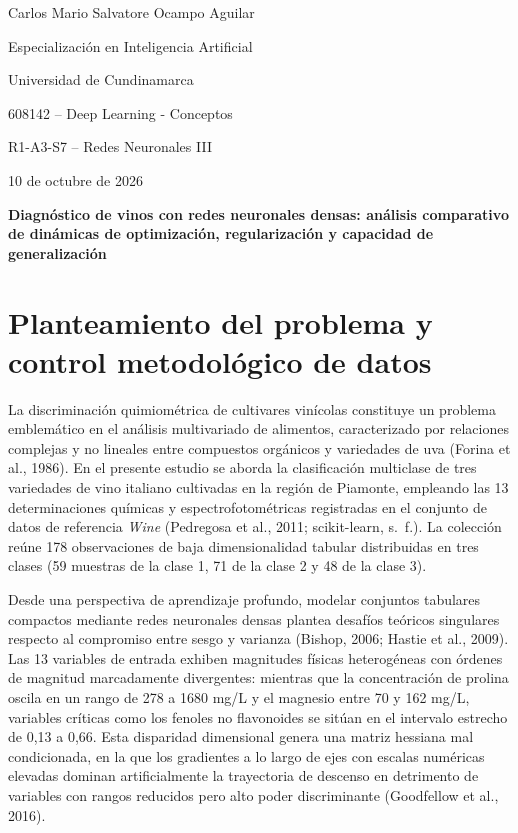 \documentclass[12pt,letterpaper]{article}
\begin{document}
\raggedright
\begin{titlepage}\thispagestyle{fancy}\begin{center}
\vspace*{1in}{\bfseries Diagnóstico de vinos con redes neuronales densas: análisis comparativo de dinámicas de optimización, regularización y capacidad de generalización\par}\vspace{1\baselineskip}
Carlos Mario Salvatore Ocampo Aguilar\par
Especialización en Inteligencia Artificial\par Universidad de Cundinamarca\par
608142 -- Deep Learning - Conceptos\par R1-A3-S7 -- Redes Neuronales III\par 10 de octubre de 2026\par
\end{center}\vfill\end{titlepage}\setcounter{page}{2}
\begin{center}\textbf{Diagnóstico de vinos con redes neuronales densas: análisis comparativo de dinámicas de optimización, regularización y capacidad de generalización}\end{center}

\section{Planteamiento del problema y control metodológico de datos}
La discriminación quimiométrica de cultivares vinícolas constituye un problema emblemático en el análisis multivariado de alimentos, caracterizado por relaciones complejas y no lineales entre compuestos orgánicos y variedades de uva (Forina et al., 1986). En el presente estudio se aborda la clasificación multiclase de tres variedades de vino italiano cultivadas en la región de Piamonte, empleando las 13 determinaciones químicas y espectrofotométricas registradas en el conjunto de datos de referencia \textit{Wine} (Pedregosa et al., 2011; scikit-learn, s.~f.). La colección reúne 178 observaciones de baja dimensionalidad tabular distribuidas en tres clases (59 muestras de la clase 1, 71 de la clase 2 y 48 de la clase 3).

Desde una perspectiva de aprendizaje profundo, modelar conjuntos tabulares compactos mediante redes neuronales densas plantea desafíos teóricos singulares respecto al compromiso entre sesgo y varianza (Bishop, 2006; Hastie et al., 2009). Las 13 variables de entrada exhiben magnitudes físicas heterogéneas con órdenes de magnitud marcadamente divergentes: mientras que la concentración de prolina oscila en un rango de 278 a 1680 mg/L y el magnesio entre 70 y 162 mg/L, variables críticas como los fenoles no flavonoides se sitúan en el intervalo estrecho de 0,13 a 0,66. Esta disparidad dimensional genera una matriz hessiana mal condicionada, en la que los gradientes a lo largo de ejes con escalas numéricas elevadas dominan artificialmente la trayectoria de descenso en detrimento de variables con rangos reducidos pero alto poder discriminante (Goodfellow et al., 2016).
\end{document}
